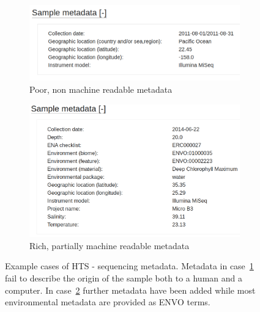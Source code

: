       \begin{figure}

         \centering

         \begin{subfigure}{0.72\textwidth}
           \includegraphics[width=\linewidth]{figures/SRS1753450_metadata.png}
           \caption{Poor, non machine readable metadata} \label{fig:metadata_examples_a}
         \end{subfigure}%
         
         \hspace*{\fill}   %
         
         \begin{subfigure}{0.72\textwidth}
           \includegraphics[width=\linewidth]{figures/ERS667566_metadata.png}
           \caption{Rich, partially machine readable metadata} \label{fig:metadata_examples_b}
         
         \end{subfigure}
       
       \caption[Samples metadata examples MGnify]{Example cases of HTS - sequencing metadata. Metadata in case~\ref{fig:metadata_examples_a} fail to describe 
       the origin of the sample both to a human and a computer. 
       In case~\ref{fig:metadata_examples_b} further metadata have been added 
       while most environmental metadata are provided as ENVO terms. 
       } 
       \label{fig:metadata_examples}
      \end{figure}


